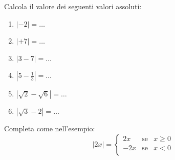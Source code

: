 \subsubsection*{}


Calcola il valore dei seguenti valori assoluti:
\begin{enumerate}
\item $|-2|=\dots$
\item $|+7|=\dots$
\item $|3-7|=\dots$
\item $|5-\frac{1}{3}|=\dots$
\item $|\sqrt{2}-\sqrt{6}|=\dots$
\item $|\sqrt{3}-2|=\dots$
\end{enumerate}

Completa come nell'esempio:
$$
|2x|=
        \left\lbrace 
        \begin{array}{lcl}
        2x & \text{se}& x\geq 0\\
        -2x & \text{se}& x< 0\\
        \end{array}
        \right.
$$

